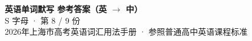 \documentclass[10pt,a4paper]{article}
\begin{document}
\pagestyle{plain}

\begin{center}
{\LARGE\bfseries 英语单词默写 \quad 参考答案（英 $\to$ 中）}\\[0.22em]
{\large S 字母 · 第 8 / 9 份}\\[0.18em]
{\small 2026年上海市高考英语词汇用法手册 · 参照普通高中英语课程标准}
\end{center}

\vspace{0.2em}
\noindent{\color{rulegray}\rule{\textwidth}{0.8pt}}

\vspace{0.35em}

\vspace{0.25em}
\renewcommand{\arraystretch}{1.32}
\end{document}
